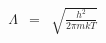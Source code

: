 \documentclass[12pt]{article}
\begin{document}
\begin{eqnarray*}
\Lambda &=& \sqrt{ \frac{h^2}{2 \pi m k T}}
\end{eqnarray*}
\end{document}
